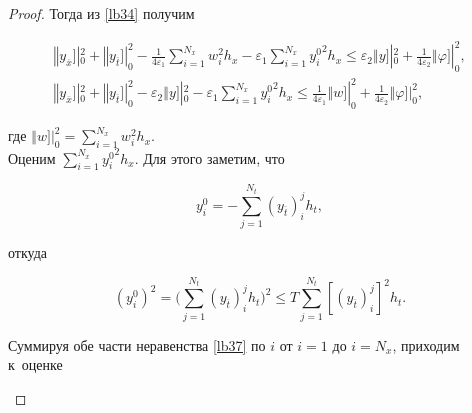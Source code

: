 \begin{proof}


Тогда из \eqref{lb34} получим

\begin{gather}

\left\Vert y_{\overline{x}}\right.]|_{0}^{2}+\left\Vert y_{\overline{t}}\right.]|_{0}^{2}-

\frac{1}{4\varepsilon_1}\sum\limits_{i=1}^{N_x}  w_{i}^{2} h_x-

\varepsilon_1 \sum\limits_{i=1}^{N_x} \left.y_{i}^{0}\right.^2 h_x \leqslant\varepsilon_2 \left\Vert y \right.]|_{0}^{2}+\frac{1}{4\varepsilon_2} \left\Vert \varphi \right.]|_{0}^{2},

\\

\label{lb36}

\left\Vert y_{\overline{x}}\right.]|_{0}^{2}+\left\Vert y_{\overline{t}}\right.]|_{0}^{2}-\varepsilon_2 \left\Vert y \right.]|_{0}^{2}-\varepsilon_1\sum\limits_{i=1}^{N_x} \left.y_{i}^{0}\right.^2 h_x \leqslant \frac{1}{4\varepsilon_1}\left\Vert w \right.]|_{0}^{2}+\frac{1}{4\varepsilon_2} \left\Vert \varphi \right.]|_{0}^{2},

\end{gather}

где $\left\Vert w \right.]|_{0}^{2}=\sum _{i=1}^{N_x}  w_{i}^{2} h_x$.\\

Оценим $\sum _{i=1}^{N_x} \left.y_{i}^{0}\right.^2 h_x$. Для этого заметим, что 

$$

y_{i}^{0}=-\sum\limits_{j=1}^{N_t}(y_{\overline{t}})_{i}^{j} h_t,

$$ 

откуда

\begin{equation}

\label{lb37}

(y_{i}^{0})^2=\biggl(\sum\limits_{j=1}^{N_t}(y_{\overline{t}})_{i}^{j} h_t\biggr)^2\leqslant

T \sum\limits_{j=1}^{N_t}\left[(y_{\overline{t}})_{i}^{j}\right]^2 h_t.

\end{equation} 

Суммируя обе части неравенства \eqref{lb37} по $i$ от $i=1$ до $i=N_x$, приходим к~оценке 

\begin{equation}


\end{equation}
\end{proof}
